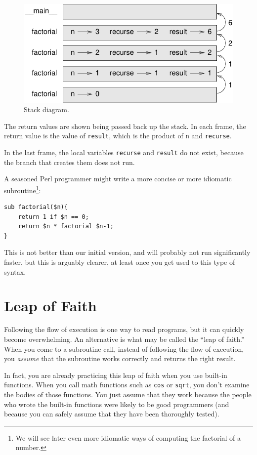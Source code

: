 \begin{figure}
\centerline
{\includegraphics[scale=0.8]{figs/stack3.pdf}}
\caption{Stack diagram.}
\label{fig.stack3}
\end{figure}

The return values are shown being passed back up the stack.  In each
frame, the return value is the value of {\tt result}, which is the
product of {\tt n} and {\tt recurse}.

In the last frame, the local
variables {\tt recurse} and {\tt result} do not exist, because
the branch that creates them does not run.

A seasoned Perl programmer might write a more concise or
more idiomatic subroutine\footnote{We will see later even 
more idiomatic ways of computing the factorial of a number.}:

\begin{verbatim}
sub factorial($n){
    return 1 if $n == 0;
    return $n * factorial $n-1;
}
\end{verbatim}
%
This is not better than our initial version, and will probably 
not run significantly faster, but this is arguably clearer, 
at least once you get used to this type of syntax.

\section{Leap of Faith}

Following the flow of execution is one way to read programs, but
it can quickly become overwhelming.  An alternative is what may 
be called the ``leap of faith.''  When you come to a
subroutine call, instead of following the flow of execution, you {\em
assume} that the subroutine works correctly and returns the right
result.

In fact, you are already practicing this leap of faith when you use
built-in functions.  When you call math functions such as {\tt cos} or {\tt sqrt},
you don't examine the bodies of those functions.  You just
assume that they work because the people who wrote the built-in
functions were likely to be good programmers (and because you 
can safely assume that they have been thoroughly tested).


